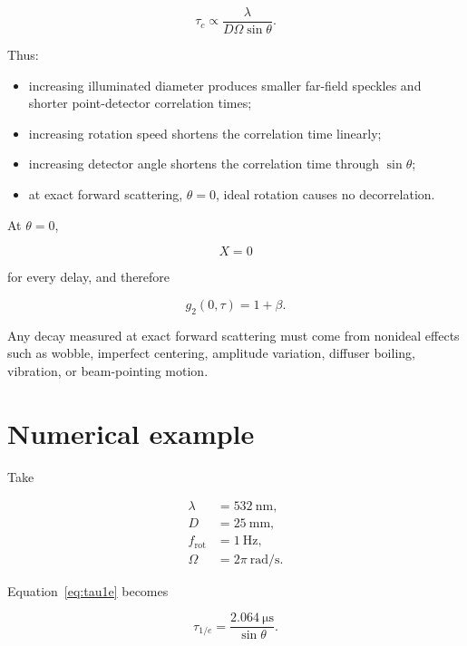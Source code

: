 \documentclass[11pt]{article}
\begin{document}
\begin{equation}
    \tau_c
    \propto
    \frac{\lambda}{
        D\Omega\sin\theta
    }.
\end{equation}

Thus:

\begin{itemize}
    \item increasing illuminated diameter produces smaller far-field speckles
    and shorter point-detector correlation times;
    \item increasing rotation speed shortens the correlation time linearly;
    \item increasing detector angle shortens the correlation time through
    $\sin\theta$;
    \item at exact forward scattering, $\theta=0$, ideal rotation causes no
    decorrelation.
\end{itemize}

At $\theta=0$,

\begin{equation}
    X=0
\end{equation}

for every delay, and therefore

\begin{equation}
    g_2(0,\tau)=1+\beta.
\end{equation}

Any decay measured at exact forward scattering must come from nonideal
effects such as wobble, imperfect centering, amplitude variation, diffuser
boiling, vibration, or beam-pointing motion.

\section{Numerical example}

Take

\begin{align}
    \lambda &= \SI{532}{\nano\meter},\\
    D &= \SI{25}{\milli\meter},\\
    f_{\mathrm{rot}} &= \SI{1}{\hertz},\\
    \Omega &= 2\pi\ \si{\radian\per\second}.
\end{align}

Equation~\eqref{eq:tau1e} becomes

\begin{equation}
    \boxed{
    \tau_{1/e}
    =
    \frac{
        \SI{2.064}{\micro\second}
    }{
        \sin\theta
    }
    }.
\end{equation}
\end{document}
